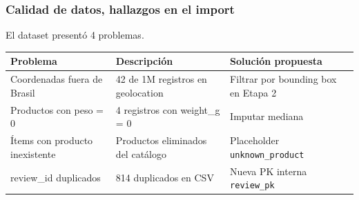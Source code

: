 \documentclass[aspectratio=169,11pt]{beamer}
\begin{document}
\begin{frame}

\frametitle{Calidad de datos, hallazgos en el import}


El dataset presentó 4 problemas.

\vspace{4mm}

\begin{tabular}{@{}p{4.35cm}p{4.1cm}p{5cm}@{}}
\toprule
Problema & Descripción & Solución propuesta \\
\midrule
Coordenadas fuera de Brasil &
42 de 1M registros en geolocation &
Filtrar por bounding box en Etapa 2 \\

\addlinespace

Productos con peso = 0 &
4 registros con weight\_g = 0 &
Imputar mediana \\

\addlinespace

Ítems con producto inexistente &
Productos eliminados del catálogo &
Placeholder \texttt{unknown\_product} \\

\addlinespace

review\_id duplicados &
814 duplicados en CSV &
Nueva PK interna \texttt{review\_pk} \\
\bottomrule
\end{tabular}

\vspace{4mm}




\end{frame}
\end{document}
